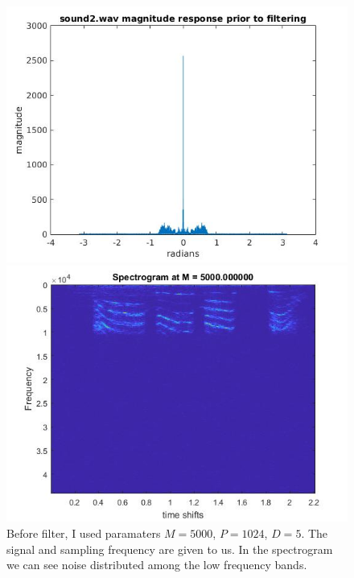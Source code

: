 \documentclass{article}
\begin{document}
\begin{figure}[H]
\includegraphics[scale = .5]{report7_1}
\includegraphics[scale = .5]{report7_2}
\\Before filter, I used paramaters $M = 5000$, $P = 1024$, $D = 5$. The signal and sampling frequency are given to us.
In the spectrogram we can see noise distributed among the low frequency bands.
\end{figure}
\end{document}

